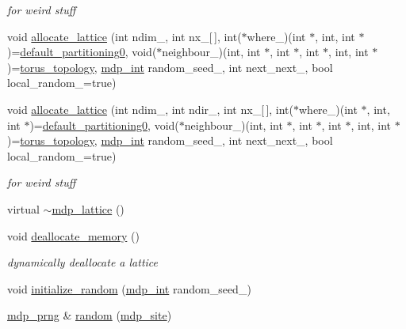 \begin{DoxyCompactItemize}
\begin{DoxyCompactList}\small\item\em for weird stuff \end{DoxyCompactList}\item 
void \hyperlink{classmdp__lattice_a04f3271fe78a6f61f10c4151145f6db5}{allocate\+\_\+lattice} (int ndim\+\_\+, int nx\+\_\+\mbox{[}$\,$\mbox{]}, int($\ast$where\+\_\+)(int $\ast$, int, int $\ast$)=\hyperlink{mdp__partitionings_8h_a717f073ea8969d6e22c586a8eba267ad}{default\+\_\+partitioning0}, void($\ast$neighbour\+\_\+)(int, int $\ast$, int $\ast$, int $\ast$, int, int $\ast$)=\hyperlink{mdp__topologies_8h_a6aec8ec4cbeb8205be5727f6493824dd}{torus\+\_\+topology}, \hyperlink{mdp__global__vars_8h_aaa1ad9d0dcd2124aa5af0120d9954174}{mdp\+\_\+int} random\+\_\+seed\+\_, int next\+\_\+next\+\_, bool local\+\_\+random\+\_\+=true)
\item 
void \hyperlink{classmdp__lattice_a8e5ed5d10679379892b46f3359d5971c}{allocate\+\_\+lattice} (int ndim\+\_\+, int ndir\+\_\+, int nx\+\_\+\mbox{[}$\,$\mbox{]}, int($\ast$where\+\_\+)(int $\ast$, int, int $\ast$)=\hyperlink{mdp__partitionings_8h_a717f073ea8969d6e22c586a8eba267ad}{default\+\_\+partitioning0}, void($\ast$neighbour\+\_\+)(int, int $\ast$, int $\ast$, int $\ast$, int, int $\ast$)=\hyperlink{mdp__topologies_8h_a6aec8ec4cbeb8205be5727f6493824dd}{torus\+\_\+topology}, \hyperlink{mdp__global__vars_8h_aaa1ad9d0dcd2124aa5af0120d9954174}{mdp\+\_\+int} random\+\_\+seed\+\_, int next\+\_\+next\+\_, bool local\+\_\+random\+\_\+=true)
\begin{DoxyCompactList}\small\item\em for weird stuff \end{DoxyCompactList}\item 
virtual \hyperlink{classmdp__lattice_a04eafca14369c88c7c469ffeb72e54ec}{$\sim$mdp\+\_\+lattice} ()
\item 
void \hyperlink{classmdp__lattice_af5407cf7f7d5eded3870abf0515e110d}{deallocate\+\_\+memory} ()
\begin{DoxyCompactList}\small\item\em dynamically deallocate a lattice \end{DoxyCompactList}\item 
void \hyperlink{classmdp__lattice_a1d9c9be3661c7e0ccd05d9c1ed620178}{initialize\+\_\+random} (\hyperlink{mdp__global__vars_8h_aaa1ad9d0dcd2124aa5af0120d9954174}{mdp\+\_\+int} random\+\_\+seed\+\_)
\item 
\hyperlink{classmdp__prng}{mdp\+\_\+prng} \& \hyperlink{classmdp__lattice_a93f774075f5829c57009c644a74cfd4a}{random} (\hyperlink{classmdp__site}{mdp\+\_\+site})

\end{DoxyCompactItemize}
